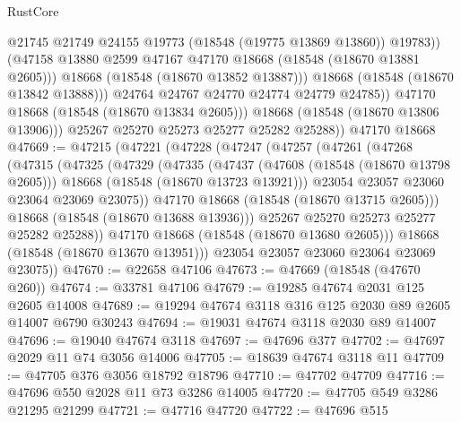\begin{lexlean}{RustCore}
\begin{coremodule}
                        @21745
                        @21749
                        @24155
                        @19773
                        (@18548 (@19775 @13869 @13860))
                        @19783))
                    (@47158 @13880 @2599 @47167 @47170 @18668 (@18548 (@18670 @13881 @2605)))
                    @18668
                    (@18548 (@18670 @13852 @13887)))
                  @18668
                  (@18548 (@18670 @13842 @13888)))
                @24764
                @24767
                @24770
                @24774
                @24779
                @24785))
            @47170
            @18668
            (@18548 (@18670 @13834 @2605)))
          @18668
          (@18548 (@18670 @13806 @13906)))
        @25267
        @25270
        @25273
        @25277
        @25282
        @25288))
    @47170
    @18668
@47669 := @47215
    (@47221
      (@47228
        (@47247
          (@47257
            (@47261
              (@47268
                (@47315
                  (@47325
                    (@47329
                      (@47335
                        (@47437
                          (@47608 (@18548 (@18670 @13798 @2605)))
                          @18668
                          (@18548 (@18670 @13723 @13921)))
                        @23054
                        @23057
                        @23060
                        @23064
                        @23069
                        @23075))
                    @47170
                    @18668
                    (@18548 (@18670 @13715 @2605)))
                  @18668
                  (@18548 (@18670 @13688 @13936)))
                @25267
                @25270
                @25273
                @25277
                @25282
                @25288))
            @47170
            @18668
            (@18548 (@18670 @13680 @2605)))
          @18668
          (@18548 (@18670 @13670 @13951)))
        @23054
        @23057
        @23060
        @23064
        @23069
        @23075))
@47670 := @22658 @47106
@47673 := @47669 (@18548 (@47670 @260))
@47674 := @33781 @47106
@47679 := @19285 @47674 @2031 @125 @2605 @14008
@47689 := @19294 @47674 @3118 @316 @125 @2030 @89 @2605 @14007 @6790 @30243
@47694 := @19031 @47674 @3118 @2030 @89 @14007
@47696 := @19040 @47674 @3118
@47697 := @47696 @377
@47702 := @47697 @2029 @11 @74 @3056 @14006
@47705 := @18639 @47674 @3118 @11
@47709 := @47705 @376 @3056 @18792 @18796
@47710 := @47702 @47709
@47716 := @47696 @550 @2028 @11 @73 @3286 @14005
@47720 := @47705 @549 @3286 @21295 @21299
@47721 := @47716 @47720
@47722 := @47696 @515

\end{coremodule}
\end{lexlean}
